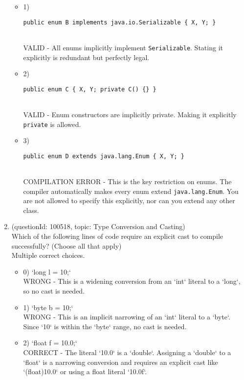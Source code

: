 \documentclass[12pt]{article}
\begin{document}
\begin{enumerate}[label=(\arabic*)]
\begin{itemize}
\item 1) \begin{verbatim}public enum B implements java.io.Serializable { X, Y; }\end{verbatim}
 \\ 
VALID - All enums implicitly implement \verb|Serializable|. Stating it explicitly is redundant but perfectly legal.

\item 2) \begin{verbatim}public enum C { X, Y; private C() {} }\end{verbatim}
 \\ 
VALID - Enum constructors are implicitly private. Making it explicitly \verb|private| is allowed.

\item 3) \begin{verbatim}public enum D extends java.lang.Enum { X, Y; }\end{verbatim}
 \\ 
COMPILATION ERROR - This is the key restriction on enums. The compiler automatically makes every enum extend \verb|java.lang.Enum|. You are not allowed to specify this explicitly, nor can you extend any other class.

\end{itemize}
\item (questionId: 100518, topic: Type Conversion and Casting) \\ 
Which of the following lines of code require an explicit cast to compile successfully? (Choose all that apply)
\\ \noindent Multiple correct choices. 
\begin{itemize}
\item 0) `long l = 10;`
 \\ 
WRONG - This is a widening conversion from an `int` literal to a `long`, so no cast is needed.

\item 1) `byte b = 10;`
 \\ 
WRONG - This is an implicit narrowing of an `int` literal to a `byte`. Since `10` is within the `byte` range, no cast is needed.

\item 2) `float f = 10.0;`
 \\ 
CORRECT - The literal `10.0` is a `double`. Assigning a `double` to a `float` is a narrowing conversion and requires an explicit cast like `(float)10.0` or using a float literal `10.0f`.


\end{itemize}
\end{enumerate}
\end{document}
